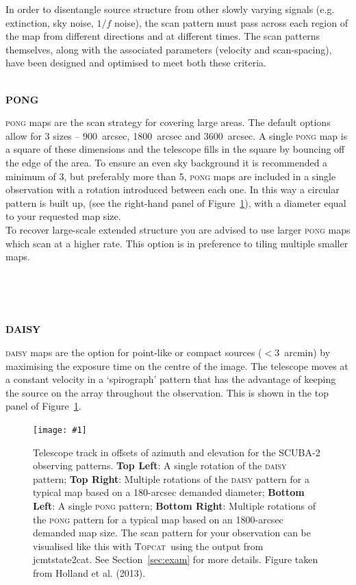 \documentclass[twoside,11pt]{article}
\newcommand{\htmladdnormallink}[2]{#1}
\newcommand{\htmladdimg}[1]{}
\newcommand{\htmlref}[2]{#1}
\newcommand{\latexhtml}[2]{#1}
\newcommand{\xref}[3]{#1}
\renewcommand{\_}{\texttt{\symbol{95}}}
\newcommand{\topcat}{\htmladdnormallink{\textsc{Topcat}}{http://www.starlink.ac.uk/topcat}}
\newcommand{\task}[1]{\textsf{#1}}
\newcommand{\jcmtstate}{\xref{\task{jcmtstate2cat}}{sun258}{JCMTSTATE2CAT}}
\newcommand{\myfig}[5]{
  \begin{figure}#2
    \centering\texttt{[image: \#1]}
    \typeout{#1.eps inserted on page \arabic{page}}
    \caption{\label{#4}\small #5}
  \end{figure}
}
\newcommand{\myfig}[5]{
    \label{#4} \htmladdimg{#1.png}\\
    \\
    Figure: #5\\
  }
\newcommand{\cref}[3]{\latexhtml{#1~\ref{#2}}{\htmlref{#3}{#2}}}
\begin{document}
In order to disentangle source structure from other
slowly varying signals (e.g. extinction, sky noise, $1/f$ noise), the
scan pattern must pass across each region of the map from different
directions and at different times. The scan patterns themselves, along
with the associated parameters (velocity and scan-spacing), have been
designed and optimised to meet both these criteria.
\\ \\
\begin{minipage}[t]{0.12\linewidth}
\textbf{PONG}
\end{minipage}
\begin{minipage}[t]{0.85\linewidth}\textsc{pong} maps are the scan
strategy for covering large areas. The default options allow for 3
sizes -- 900~arcsec, 1800~arcsec and 3600~arcsec. A single \textsc{pong} map is
a square of these dimensions and the telescope fills in the square by
bouncing off the edge of the area. To ensure an even sky background it
is recommended a minimum of 3, but preferably more than 5,
\textsc{pong} maps are included in a single observation with a
rotation introduced between each one. In this way a circular pattern
is built up, (see the right-hand panel of \cref{Figure}{fig:scan}{graphic below}),
with a diameter equal to your requested map size.
\vspace{0.2cm}\\
To recover large-scale extended structure you are advised to use
larger \textsc{pong} maps which scan at a higher rate. This option is
in preference to tiling multiple smaller maps.
\end{minipage}
\\ \\ \\
\begin{minipage}[t]{0.12\linewidth}
\textbf{DAISY}
\end{minipage}
\begin{minipage}[t]{0.85\linewidth}
\textsc{daisy} maps are the option for point-like or compact sources
($<$3~arcmin) by maximising the exposure time on the centre of the
image. The telescope moves at a constant velocity in a `spirograph'
pattern that has the advantage of keeping the source on the array
throughout the observation. This is shown in the top panel of
\cref{Figure}{fig:scan}{the figure below}.
\end{minipage}

\myfig{sc21_wayne_scan}{[b!]}{width=0.9\linewidth}{fig:scan}{
  Telescope track in offsets of azimuth and elevation for the SCUBA-2
  observing patterns. \textbf{Top Left}: A single rotation of the
  \textsc{daisy} pattern; \textbf{Top Right}: Multiple rotations of
  the \textsc{daisy} pattern for a typical map based on a 180-arcsec
  demanded diameter; \textbf{Bottom Left}: A single \textsc{pong}
  pattern; \textbf{Bottom Right}: Multiple rotations of the
  \textsc{pong} pattern for a typical map based on an 1800-arcsec
  demanded map size. The scan pattern for your observation can be
  visualised like this with \topcat\ using the output from \jcmtstate.
  See \cref{Section}{sec:exam}{Examining raw data} for more details.
  Figure taken from Holland et al. (2013).}
\end{document}
